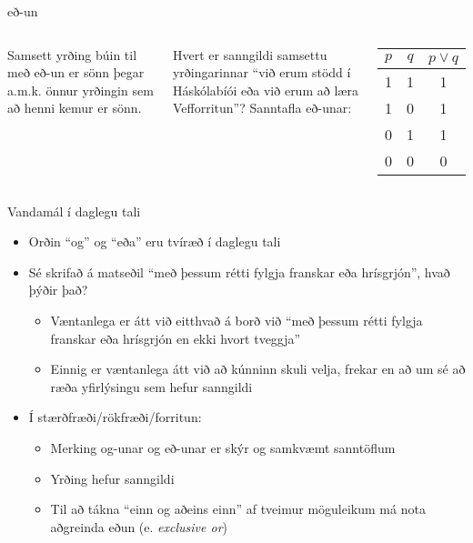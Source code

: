\documentclass{beamer}
\begin{document}
\begin{frame}{eð-un}
\begin{columns}
Samsett yrðing búin til með eð-un er sönn þegar a.m.k. önnur yrðingin sem að henni kemur er sönn.

\vspace*{0.5cm}
Hvert er sanngildi samsettu yrðingarinnar ``við erum stödd í Háskólabíói eða við erum að læra Vefforritun''? \pause
{}
Sanntafla eð-unar:
\begin{center}
\begin{tabular}{ccc}
\toprule
$p$&$q$&$p \lor q$ \\
\midrule
1&1&1\\
1&0&1\\
0&1&1\\
0&0&0\\
\bottomrule
\end{tabular}
\end{center}
\end{columns}
\end{frame}

\begin{frame}{Vandamál í daglegu tali}
\begin{itemize}
 \item Orðin ``og'' og ``eða'' eru tvíræð í daglegu tali
 \item Sé skrifað á matseðil ``með þessum rétti fylgja franskar eða hrísgrjón'', hvað þýðir það?\pause
 \begin{itemize}
  \item Væntanlega er átt við eitthvað á borð við ``með þessum rétti fylgja franskar eða hrísgrjón en ekki hvort tveggja''
  \item Einnig er væntanlega átt við að kúnninn skuli velja, frekar en að um sé að ræða yfirlýsingu sem hefur sanngildi \pause
 \end{itemize}
 \item Í stærðfræði/rökfræði/forritun: 
 \begin{itemize}
  \item Merking og-unar og eð-unar er skýr og samkvæmt sanntöflum
  \item Yrðing hefur sanngildi
  \item Til að tákna ``einn og aðeins einn'' af tveimur möguleikum má nota aðgreinda eðun (e. \emph{exclusive or})
 \end{itemize}
\end{itemize}
\end{frame}
\end{document}
